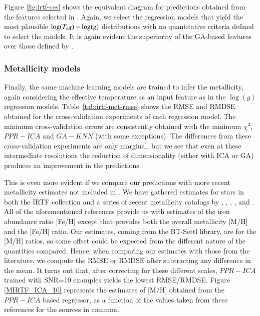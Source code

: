 Figure \ref{fig:irtf-ces} shows the equivalent diagram for predictions
obtained from the features selected in \cite{cesetti}. Again, we
select the regression models that yield the most plausible
$\log(T_{\rm eff})-\log(g)$ distributions with no quantitative
criteria defined to select the models. It is again evident the
superiority of the GA-based features over those defined
by \cite{cesetti}.

\subsubsection{Metallicity models} 
\label{sect:irtf-met}

Finally, the same machine learning models are trained to infer the
metallicity, again considering the effective temperature as an input
feature as in the $\log(g)$ regression
models. Table~\ref{tab:irtf-met-rmse} shows the RMSE and RMDSE
obtained for the cross-validation experiments of each regression
model. The minimum cross-validation errors are consistently obtained
with the minimum $\chi^2$, $PPR-ICA$ and $GA-KNN$ (with some
exceptions). The differences from these cross-validation experiments
are only marginal, but we see that even at these intermediate
resolutions the reduction of dimensionality (either with ICA or GA)
produces an improvement in the predictions. 

This is even more evident if we compare our predictions with more
recent metallicity estimates not included in \cite{cesetti}. We have
gathered estimates for stars in both the IRTF collection and a series
of recent metallicity catalogs
by \cite{RA2012}, \cite{NevesIII}, \cite{Newton2014}, \cite{Gaidos2015},
and \cite{Mann2015}. All of the aforementioned references provide us
with estimates of the iron abundance ratio [Fe/H] except \cite{RA2012}
that provides both the overall metallicity [M/H] and the [Fe/H]
ratio. Our estimates, coming from the BT-Settl library, are for the
[M/H] ratios, so some offset could be expected from the different
nature of the quantities compared. Hence, when comparing our estimates
with those from the literature, we compute the RMSE or RMDSE after
subtracting any difference in the mean. It turns out that, after
correcting for these different scales, $PPR-ICA$ trained with SNR=10
examples yields the lowest RMSE/RMDSE. Figure \ref{MIRTF_ICA_10}
represents the estimates of [M/H] obtained from the $PPR-ICA$ based
regressor, as a function of the values taken from these references for
the sources in common. 


